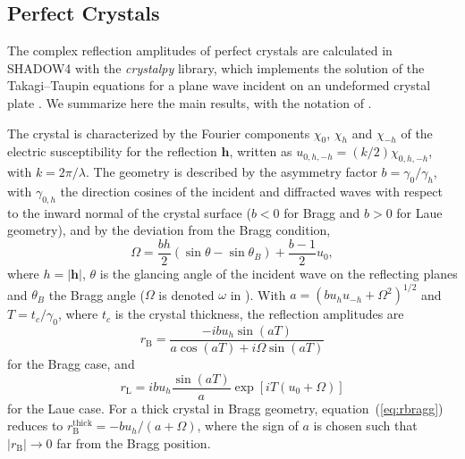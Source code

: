 \documentclass{iucr}
\begin{document}
\subsection{Perfect Crystals}

The complex reflection amplitudes of perfect crystals are calculated in SHADOW4 with the {\it crystalpy} library, which implements the solution of the Takagi--Taupin equations for a plane wave incident on an undeformed crystal plate \cite{Guigay2024}. We summarize here the main results, with the notation of \cite{Guigay2024}.

The crystal is characterized by the Fourier components $\chi_0$, $\chi_h$ and $\chi_{-h}$ of the electric susceptibility for the reflection $\mathbf{h}$, written as $u_{0,h,-h}=(k/2)\chi_{0,h,-h}$, with $k=2\pi/\lambda$. The geometry is described by the asymmetry factor $b=\gamma_0/\gamma_h$, with $\gamma_{0,h}$ the direction cosines of the incident and diffracted waves with respect to the inward normal of the crystal surface ($b<0$ for Bragg and $b>0$ for Laue geometry), and by the deviation from the Bragg condition,
\begin{equation}
\Omega = \frac{bh}{2}(\sin\theta - \sin\theta_B) + \frac{b-1}{2}u_0,
\end{equation}
where $h=|\mathbf{h}|$, $\theta$ is the glancing angle of the incident wave on the reflecting planes and $\theta_B$ the Bragg angle ($\Omega$ is denoted $\omega$ in \cite{Guigay2024}). With $a=(bu_hu_{-h}+\Omega^2)^{1/2}$ and $T=t_c/\gamma_0$, where $t_c$ is the crystal thickness, the reflection amplitudes are
\begin{equation}\label{eq:rbragg}
r_{\mathrm{B}} = \frac{-i b u_h \sin(aT)}{a\cos(aT)+i\Omega\sin(aT)}
\end{equation}
for the Bragg case, and
\begin{equation}\label{eq:rlaue}
r_{\mathrm{L}} = i b u_h \frac{\sin(aT)}{a} \exp[iT(u_0+\Omega)]
\end{equation}
for the Laue case. For a thick crystal in Bragg geometry, equation~(\ref{eq:rbragg}) reduces to $r_{\mathrm{B}}^{\mathrm{thick}} = -bu_h/(a+\Omega)$, where the sign of $a$ is chosen such that $|r_{\mathrm{B}}|\rightarrow 0$ far from the Bragg position.
\end{document}

